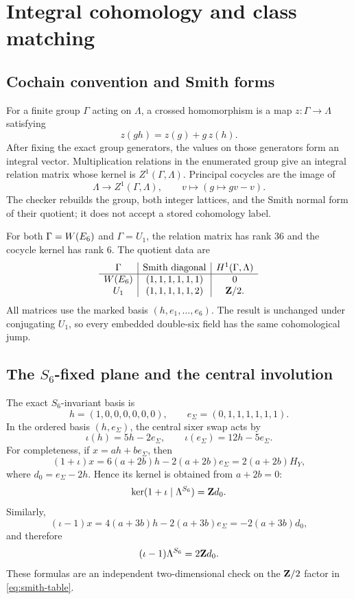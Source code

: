 \section{Integral cohomology and class matching}
\label{app:cohomology}

\subsection{Cochain convention and Smith forms}

For a finite group \(\Gamma\) acting on \(\Lambda\), a crossed homomorphism is
a map \(z:\Gamma\to\Lambda\) satisfying
\[
 z(gh)=z(g)+g\,z(h).
\]
After fixing the exact group generators, the values on those generators form
an integral vector.  Multiplication relations in the enumerated group give an
integral relation matrix whose kernel is \(Z^1(\Gamma,\Lambda)\).  Principal
cocycles are the image of
\[
 \Lambda\longrightarrow Z^1(\Gamma,\Lambda),\qquad
 v\longmapsto(g\mapsto gv-v).
\]
The checker rebuilds the group, both integer lattices, and the Smith normal
form of their quotient; it does not accept a stored cohomology label.

For both \(\Gamma=W(E_6)\) and \(\Gamma=U_1\), the relation matrix has rank
\(36\) and the cocycle kernel has rank \(6\).  The quotient data are
\begin{equation}
\begin{array}{c|c|c}
\Gamma & \text{Smith diagonal} & H^1(\Gamma,\Lambda)\\
\hline
W(E_6) & (1,1,1,1,1,1) & 0\\
U_1 & (1,1,1,1,1,2) & \mathbf Z/2.
\end{array}
\label{eq:smith-table}
\end{equation}
All matrices use the marked basis \((h,e_1,\ldots,e_6)\).  The result is
unchanged under conjugating \(U_1\), so every embedded double-six field has
the same cohomological jump.

\subsection{The \texorpdfstring{\(S_6\)}{S6}-fixed plane and the central
involution}

The exact \(S_6\)-invariant basis is
\[
 h=(1,0,0,0,0,0,0),\qquad
 e_\Sigma=(0,1,1,1,1,1,1).
\]
In the ordered basis \((h,e_\Sigma)\), the central sixer swap acts by
\[
 \iota(h)=5h-2e_\Sigma,\qquad
 \iota(e_\Sigma)=12h-5e_\Sigma.
\]
For completeness, if \(x=ah+be_\Sigma\), then
\[
 (1+\iota)x
  =6(a+2b)h-2(a+2b)e_\Sigma
  =2(a+2b)H_Y,
\]
where \(d_0=e_\Sigma-2h\).  Hence its kernel is obtained from
\(a+2b=0\):
\[
 \ker(1+\iota\mid\Lambda^{S_6})=\mathbf Z d_0.
\]
Similarly,
\[
 (\iota-1)x
 =4(a+3b)h-2(a+3b)e_\Sigma
 =-2(a+3b)d_0,
\]
and therefore
\[
 (\iota-1)\Lambda^{S_6}=2\mathbf Z d_0.
\]
These formulas are an independent two-dimensional check on the
\(\mathbf Z/2\) factor in \cref{eq:smith-table}.

